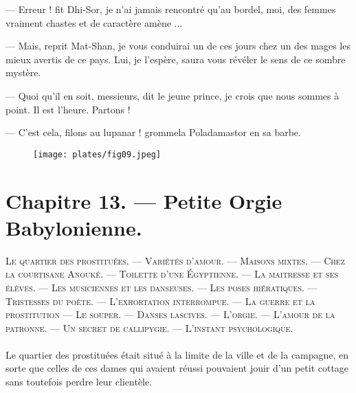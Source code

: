 \documentclass[a4paper, 11pt, oneside, polutonikogreek, french]{article}
\begin{document}
--- Erreur ! fit Dhi-Sor, je n'ai jamais rencontré qu'au bordel, moi, des femmes vraiment chastes et de caractère amène ...

--- Mais, reprit Mat-Shan, je vous conduirai un de ces jours chez un des mages les mieux avertis de ce pays. Lui, je l'espère, saura vous révéler le sens de ce sombre mystère.

--- Quoi qu'il en soit, messieurs, dit le jeune prince, je crois que nous sommes à point. Il est l'heure. Partons !

--- C'est cela, filons au lupanar ! grommela Poladamastor en sa barbe.
\clearpage
\begin{figure}[H]
\centering
\texttt{[image: plates/fig09.jpeg]}
\end{figure}
\section{Chapitre 13. --- Petite Orgie Babylonienne.}
\begin{center}
\scshape
\small
Le quartier des prostituées. --- Variétés d'amour. --- Maisons mixtes. --- Chez la courtisane Anouké. --- Toilette d'une Égyptienne. --- La maitresse et ses élèves. --- Les musiciennes et les danseuses. --- Les poses hiératiques. --- Tristesses du poète. --- L'exhortation interrompue. --- La guerre et la prostitution --- Le souper. --- Danses lascives. --- L'orgie. --- L'amour de la patronne. --- Un secret de callipygie. --- L'instant psychologique.
\end{center}
\paragraph{}
Le quartier des prostituées était situé à la limite de la ville et de la campagne, en sorte que celles de ces dames qui avaient réussi pouvaient jouir d'un petit cottage sans toutefois perdre leur clientèle.
\end{document}
